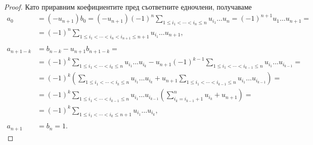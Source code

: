\documentclass[numbers=endperiod, DIV=15]{scrartcl}
\begin{document}
\begin{proof}
  Като приравним коефициентите пред съответните едночлени, получаваме
  \begin{align*}
    a_0
    &=
    (-u_{n+1}) b_0
    =
    (-u_{n+1}) {(-1)}^n \sum_{1 \leq i_1 < \cdots < i_n \leq n} u_{i_1} \ldots u_n
    =
    {(-1)}^{n+1} u_1 \ldots u_{n+1}
    = \\ &=
    {(-1)}^n \sum_{1 \leq i_1 < \cdots < i_n < i_{n+1} \leq n + 1} u_{i_1} \ldots u_{n+1},
    \\ \\
    a_{n+1-k}
    &=
    b_{n-k} - u_{n+1} b_{n+1-k}
    = \\ &=
    {(-1)}^k \sum_{1 \leq i_1 < \cdots < i_k \leq n} u_{i_1} \ldots u_{i_k} - u_{n+1} {(-1)}^{k-1} \sum_{1 \leq i_1 < \cdots < i_{k-1} \leq n} u_{i_1} \ldots u_{i_{k-1}}
    = \\ &=
    {(-1)}^k \left( \sum_{1 \leq i_1 < \cdots < i_k \leq n} u_{i_1} \ldots u_{i_k} + u_{n+1} \sum_{1 \leq i_1 < \cdots < i_{k-1} \leq n} u_{i_1} \ldots u_{i_{k-1}} \right)
    = \\ &=
    {(-1)}^k \sum_{1 \leq i_1 < \cdots < i_{k-1} \leq n} u_{i_1} \ldots u_{i_{k-1}} \left(\sum_{i_k=i_{k-1}+1}^n u_{i_k} + u_{n+1} \right)
    = \\ &=
    {(-1)}^k \sum_{1 \leq i_1 < \cdots < i_k \leq n + 1} u_{i_1} \ldots u_{i_k},
    \\ \\
    a_{n+1} &= b_n = 1.
  \end{align*}
\end{proof}


\printbibliography
\end{document}
